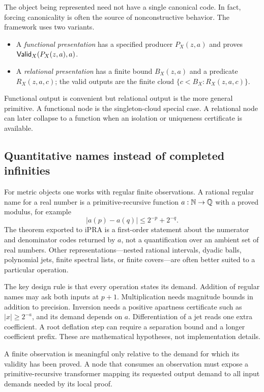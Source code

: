The object being represented need not have a single canonical code.  In fact,
forcing canonicality is often the source of nonconstructive behavior.  The
framework uses two variants.

\begin{itemize}
\item A \emph{functional presentation} has a specified producer
\(P_X(z,a)\) and proves \(\mathsf{Valid}_X(P_X(z,a),a)\).
\item A \emph{relational presentation} has a finite bound \(B_X(z,a)\) and a
predicate \(R_X(z,a,c)\); the valid outputs are the finite cloud
\(\{c<B_X:R_X(z,a,c)\}\).
\end{itemize}

Functional output is convenient but relational output is the more general
primitive.  A functional node is the singleton-cloud special case.  A
relational node can later collapse to a function when an isolation or
uniqueness certificate is available.

\subsection{Quantitative names instead of completed infinities}

For metric objects one works with regular finite observations.  A rational
regular name for a real number is a primitive-recursive function
\(a:\mathbb{N}\to\mathbb{Q}\) with a proved modulus, for example
\[
   |a(p)-a(q)|\leq 2^{-p}+2^{-q}.
\]
The theorem exported to iPRA is a first-order statement about the numerator and
denominator codes returned by \(a\), not a quantification over an ambient set
of real numbers.  Other representations---nested rational intervals, dyadic
balls, polynomial jets, finite spectral lists, or finite covers---are often
better suited to a particular operation.

The key design rule is that every operation states its demand.  Addition of
regular names may ask both inputs at \(p+1\).  Multiplication needs magnitude
bounds in addition to precision.  Inversion needs a positive apartness
certificate such as \(|x|\geq 2^{-a}\), and its demand depends on \(a\).
Differentiation of a jet reads one extra coefficient.  A root deflation step
can require a separation bound and a longer coefficient prefix.  These are
mathematical hypotheses, not implementation details.

\begin{principle}
A finite observation is meaningful only relative to the demand for which its
validity has been proved.  A node that consumes an observation must expose a
primitive-recursive transformer mapping its requested output demand to all
input demands needed by its local proof.
\end{principle}

